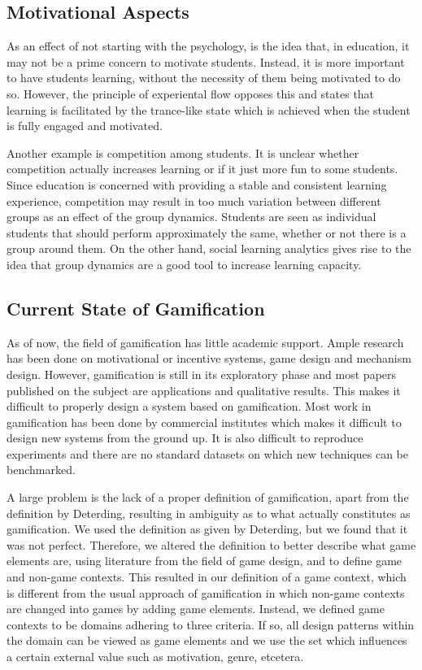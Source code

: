 \documentclass[11pt]{article}
\begin{document}
\subsection{Motivational Aspects}
As an effect of not starting with the psychology, is the idea that, in education, it may not be a prime concern to motivate students. Instead, it is more important to have students learning, without the necessity of them being motivated to do so. However, the principle of experiental flow \cite{Kiili2005} opposes this and states that learning is facilitated by the trance-like state which is achieved when the student is fully engaged and motivated.

Another example is competition among students. It is unclear whether competition actually increases learning or if it just more fun to some students. Since education is concerned with providing a stable and consistent learning experience, competition may result in too much variation between different groups as an effect of the group dynamics. Students are seen as individual students that should perform approximately the same, whether or not there is a group around them. On the other hand, social learning analytics gives rise to the idea that group dynamics are a good tool to increase learning capacity.

\subsection{Current State of Gamification}
As of now, the field of gamification has little academic support. Ample research has been done on motivational or incentive systems, game design and mechanism design.
However, gamification is still in its exploratory phase and most papers published on the subject are applications and qualitative results. This makes it difficult to properly design a system based on gamification. Most work in gamification has been done by commercial institutes which makes it difficult to design new systems from the ground up. It is also difficult to reproduce experiments and there are no standard datasets on which new techniques can be benchmarked.

A large problem is the lack of a proper definition of gamification, apart from the definition by Deterding, resulting in ambiguity as to what actually constitutes as gamification. We used the definition as given by Deterding, but we found that it was not perfect. Therefore, we altered the definition to better describe what game elements are, using literature from the field of game design, and to define game and non-game contexts. This resulted in our definition of a game context, which is different from the usual approach of gamification in which non-game contexts are changed into games by adding game elements. Instead, we defined game contexts to be domains adhering to three criteria. If so, all design patterns within the domain can be viewed as game elements and we use the set which influences a certain external value such as motivation, genre, etcetera.
\end{document}
